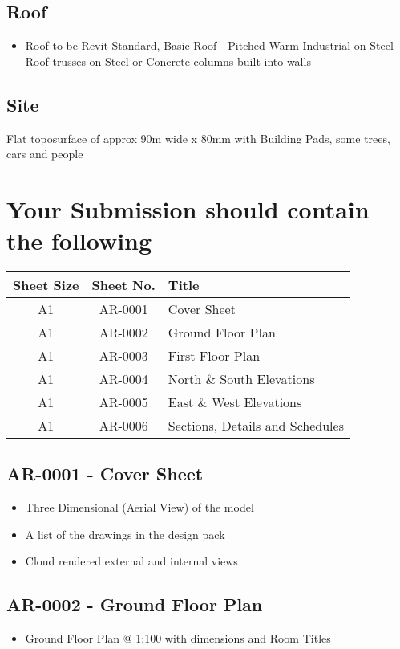 \subsection*{Roof}
\begin{itemize}
	\item Roof to be Revit Standard, Basic Roof - Pitched Warm Industrial on Steel Roof trusses on Steel or Concrete columns built into walls
\end{itemize}


\subsection*{Site}
Flat toposurface of approx 90m wide x 80mm with Building Pads, some trees, cars and people




\newpage
\section*{Your Submission should contain the following}


\begin{tabularx}{\textwidth}{ |c|c|X| }
	\hline
	\textbf{Sheet Size} & \textbf{Sheet No.} & \textbf{Title} \\
	\hline 
	A1  & AR-0001 & Cover Sheet \\
	A1  & AR-0002 & Ground Floor Plan \\
	A1  & AR-0003 & First Floor Plan \\
	A1  & AR-0004 & North \& South Elevations \\
	A1  & AR-0005 & East \& West Elevations \\
	A1  & AR-0006 & Sections, Details and Schedules \\
	\hline
\end{tabularx}


\subsection*{AR-0001 - Cover Sheet}
\begin{itemize}
	\item Three Dimensional (Aerial View) of the model
	\item A list of the drawings in the design pack
	\item Cloud rendered external and internal views
\end{itemize}


\subsection*{AR-0002 - Ground Floor Plan}
\begin{itemize}
	\item Ground Floor Plan @ 1:100 with dimensions and Room Titles
\end{itemize}


